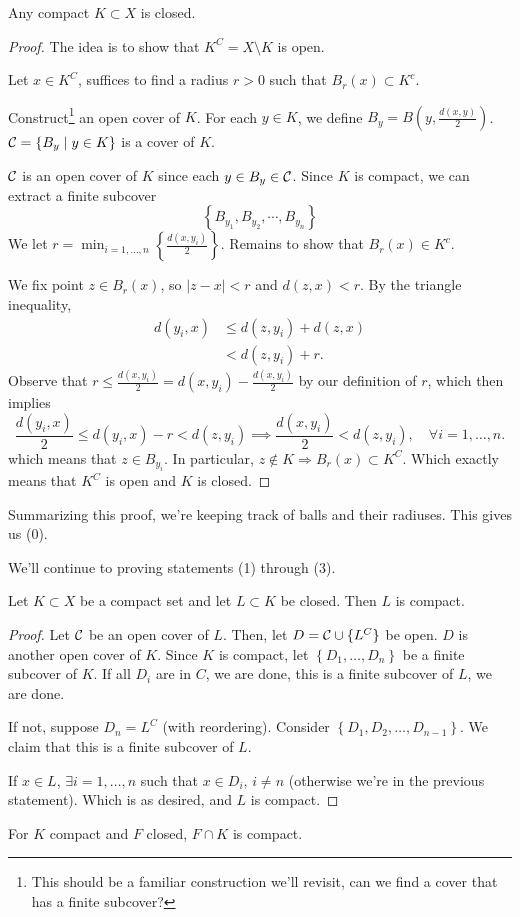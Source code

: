 \begin{theorem*}
    Any compact $K\subset X$ is closed.
\end{theorem*}
\begin{proof}
    The idea is to show that $K^C = X\setminus K$ is open.

    Let $x\in K^C$, suffices to find a radius $r > 0$ such that $B_r(x)\subset K^c$.

    Construct\footnote{This should be a familiar construction we'll revisit, can we find a cover that has a finite subcover?} an open cover of $K$. For each $y\in K$, we define $B_y = B\left(y, \frac{d(x, y)}{2}\right)$. $\mathcal C = \left\{ B_y\mid y\in K \right\}$ is a cover of $K$.

    $\mathcal C$ is an open cover of $K$ since each $y\in B_y\in \mathcal C$. Since $K$ is compact, we can extract a finite subcover
    \[\left\{ B_{y_1}, B_{y_2}, \cdots, B_{y_n} \right\}\]
    We let $\displaystyle r = \min_{i=1,\dots,n} \left\{ \frac{d(x, y_i)}{2} \right\}$. Remains to show that $B_r(x)\in K^c$.

    We fix point $z\in B_r(x)$, so $|z - x| < r$ and $d(z, x) < r$. By the triangle inequality,
    \begin{align*}
        d(y_i, x) & \leq d(z, y_i) + d(z, x) \\
                  & < d(z, y_i) + r.
    \end{align*}
    Observe that $r \leq \frac{d(x, y_i)}{2} = d(x, y_i) - \frac{d(x, y_i)}{2}$ by our definition of $r$, which then implies
    \[\frac{d(y_i, x)}{2} \leq d(y_i, x) - r < d(z, y_i)\implies \frac{d(x, y_i)}{2}< d(z, y_i),\quad\forall i = 1, \dots, n.\]
    which means that $z\in B_{y_i}$. In particular, $z\not\in K\Rightarrow B_r(x) \subset K^C$. Which exactly means that $K^C$ is open and $K$ is closed.
\end{proof}
Summarizing this proof, we're keeping track of balls and their radiuses. This gives us (0).

We'll continue to proving statements (1) through (3).

\begin{theorem}
    Let $K\subset X$ be a compact set and let $L\subset K$ be closed. Then $L$ is compact.
\end{theorem}
\begin{proof}
    Let $\mathcal C$ be an open cover of $L$. Then, let $D = \mathcal C \cup \{L^C\}$ be open. $D$ is another open cover of $K$. Since $K$ is compact, let $\left\{ D_1, \dots, D_n \right\}$ be a finite subcover of $K$. If all $D_i$ are in $C$, we are done, this is a finite subcover of $L$, we are done.

    If not, suppose $D_n = L^C$ (with reordering). Consider $\left\{ D_1, D_2, \dots, D_{n-1} \right\}$. We claim that this is a finite subcover of $L$.

    If $x\in L$, $\exists i = 1, \dots, n$ such that $x\in D_i$, $i\neq n$ (otherwise we're in the previous statement). Which is as desired, and $L$ is compact.
\end{proof}
\begin{corollary}
    For $K$ compact and $F$ closed, $F\cap K$ is compact.
\end{corollary}

